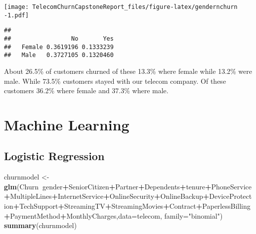 \documentclass[]{article}
\newenvironment{Shaded}{\begin{snugshade}}{\end{snugshade}}
\newcommand{\KeywordTok}[1]{\textcolor[rgb]{0.13,0.29,0.53}{\textbf{#1}}}
\newcommand{\DataTypeTok}[1]{\textcolor[rgb]{0.13,0.29,0.53}{#1}}
\newcommand{\StringTok}[1]{\textcolor[rgb]{0.31,0.60,0.02}{#1}}
\newcommand{\OperatorTok}[1]{\textcolor[rgb]{0.81,0.36,0.00}{\textbf{#1}}}
\newcommand{\NormalTok}[1]{#1}
\begin{document}
\texttt{[image: TelecomChurnCapstoneReport\_files/figure-latex/gendernchurn -1.pdf]}

\begin{Shaded}
\end{Shaded}

\begin{verbatim}
##         
##                 No       Yes
##   Female 0.3619196 0.1333239
##   Male   0.3727105 0.1320460
\end{verbatim}

About 26.5\% of customers churned of these 13.3\% where female while
13.2\% were male. While 73.5\% customers stayed with our telecom
company. Of these customers 36.2\% where female and 37.3\% where male.

\section{Machine Learning}\label{machine-learning}

\subsection{Logistic Regression}\label{logistic-regression}

\begin{Shaded}
\begin{Highlighting}[]
\NormalTok{churnmodel <-}\StringTok{ }\KeywordTok{glm}\NormalTok{(Churn}\OperatorTok{~}\NormalTok{gender}\OperatorTok{+}\NormalTok{SeniorCitizen}\OperatorTok{+}\NormalTok{Partner}\OperatorTok{+}\NormalTok{Dependents}\OperatorTok{+}\NormalTok{tenure}\OperatorTok{+}\NormalTok{PhoneService}\OperatorTok{+}\NormalTok{MultipleLines}\OperatorTok{+}\NormalTok{InternetService}\OperatorTok{+}\NormalTok{OnlineSecurity}\OperatorTok{+}\NormalTok{OnlineBackup}\OperatorTok{+}\NormalTok{DeviceProtection}\OperatorTok{+}\NormalTok{TechSupport}\OperatorTok{+}\NormalTok{StreamingTV}\OperatorTok{+}\NormalTok{StreamingMovies}\OperatorTok{+}\NormalTok{Contract}\OperatorTok{+}\NormalTok{PaperlessBilling}\OperatorTok{+}\NormalTok{PaymentMethod}\OperatorTok{+}\NormalTok{MonthlyCharges,}\DataTypeTok{data=}\NormalTok{telecom, }\DataTypeTok{family=}\StringTok{"binomial"}\NormalTok{)}
\KeywordTok{summary}\NormalTok{(churnmodel)}
\end{Highlighting}
\end{Shaded}
\end{document}
